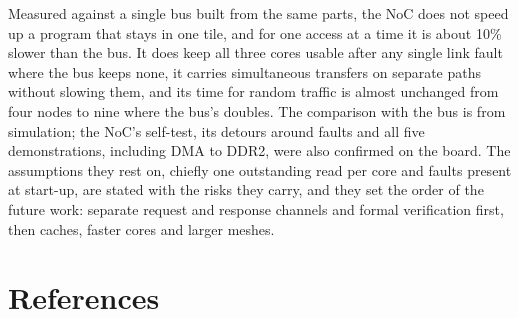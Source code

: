 \documentclass[11pt,a4paper]{article}
\begin{document}
Measured against a single bus built from the same parts, the NoC does not
speed up a program that stays in one tile, and for one access at a time it is
about 10\% slower than the bus. It does keep
all three cores usable after any single link fault where the bus keeps none,
it carries simultaneous transfers on separate paths without slowing them, and
its time for random traffic is almost unchanged from four nodes to nine where
the bus's doubles. The comparison with the bus is from simulation; the
NoC's self-test, its detours around faults and all five demonstrations,
including DMA to DDR2, were also confirmed on the board. The assumptions they
rest on, chiefly one outstanding read per core and faults present at
start-up, are stated with the risks they carry, and they set the order of the
future work: separate request and response channels and formal verification
first, then caches, faster cores and larger meshes.

\section{References}
\end{document}

